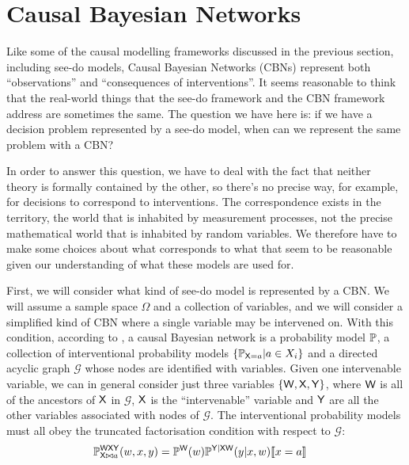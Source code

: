 

\section{Causal Bayesian Networks}\label{sec:CBN}

Like some of the causal modelling frameworks discussed in the previous section, including see-do models, Causal Bayesian Networks (CBNs) represent both ``observations'' and ``consequences of interventions''. It seems reasonable to think that the real-world things that the see-do framework and the CBN framework address are sometimes the same. The question we have here is: if we have a decision problem represented by a see-do model, when can we represent the same problem with a CBN?

In order to answer this question, we have to deal with the fact that neither theory is formally contained by the other, so there's no precise way, for example, for decisions to correspond to interventions. The correspondence exists in the territory, the world that is inhabited by measurement processes, not the precise mathematical world that is inhabited by random variables. We therefore have to make some choices about what corresponds to what that seem to be reasonable given our understanding of what these models are used for.

First, we will consider what kind of see-do model is represented by a CBN. We will assume a sample space $\Omega$ and a collection of variables, and we will consider a simplified kind of CBN where a single variable may be intervened on. With this condition, according to \citet{pearl_causality:_2009}, a causal Bayesian network is a probability model $\mathbb{P}$, a collection of interventional probability models $\{\mathbb{P}_{\mathsf{X}=a}|a\in X_i\}$ and a directed acyclic graph $\mathcal{G}$ whose nodes are identified with variables. Given one intervenable variable, we can in general consider just three variables $\{\mathsf{W},\mathsf{X},\mathsf{Y}\}$, where $\mathsf{W}$ is all of the ancestors of $\mathsf{X}$ in $\mathcal{G}$, $\mathsf{X}$ is the ``intervenable'' variable and $\mathsf{Y}$ are all the other variables associated with nodes of $\mathcal{G}$. The interventional probability models must all obey the truncated factorisation condition with respect to $\mathcal{G}$:
\begin{align}
    \mathbb{P}_{\mathsf{X}\bowtie a}^{\mathsf{W}\mathsf{X}\mathsf{Y}}(w,x,y) &= \mathbb{P}^{\mathsf{W}}(w)\mathbb{P}^{\mathsf{Y}|\mathsf{XW}}(y|x,w)\llbracket x=a \rrbracket\label{eq:truncated_fac2}
\end{align}

